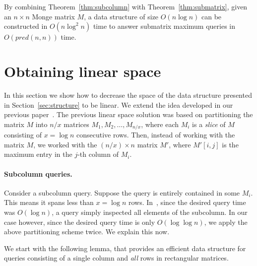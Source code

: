 \documentclass{llncs}
\newcommand{\pred}[1]{pred(#1)}
\begin{document}
By combining Theorem~\ref{thm:subcolumn} with Theorem~\ref{thm:submatrix},
given an $n\times n$ Monge matrix $M$, a data structure of size $O(n\log n)$ can be
constructed in $O(n\log^2 n)$ time to answer submatrix maximum queries in
$O(\pred{n,n})$ time.



\section{Obtaining linear space}
\label{sec:linear}
In this section we show how to decrease the space of the data structure presented in Section~\ref{sec:structure} to be linear.
We extend the idea developed in our previous paper~\cite{ourICALP}.
The previous linear space solution was based on partitioning the matrix  $M$ into $n/x$ matrices $M_{1},M_{2},\ldots,M_{n/x}$, where each $M_{i}$ is a {\em slice} of $M$ consisting of $x=\log n$ consecutive rows. 
Then, instead of working with the matrix $M$, we worked with the $(n/x)\times n$ matrix $M'$, where $M'[i,j]$ is the maximum entry in the $j$-th column of $M_{i}$.


\paragraph{\bf Subcolumn queries.}
Consider a subcolumn query. Suppose the query is entirely contained in some $M_{i}$. This means it spans less than $x=\log n$ rows. In~\cite{ourICALP}, since the desired query time was $O(\log n)$, a query  simply inspected all elements of the subcolumn. In our case however, since the desired query time is only $O(\log \log n)$, 
we apply the above partitioning scheme twice. We explain this now.

We start with the following lemma, that provides an efficient data structure for  queries consisting of a single column and {\em all} rows in rectangular matrices.
\end{document}
